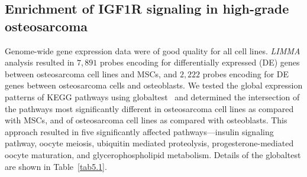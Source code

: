 \subsection{Enrichment of IGF1R signaling in high\hyp{}grade osteosarcoma}
Genome\hyp{}wide gene expression data were of good quality for all cell lines. {\it LIMMA} analysis resulted in $7,891$ probes encoding for differentially expressed (DE) genes between osteosarcoma cell lines and MSCs, and $2,222$ probes encoding for DE genes between osteosarcoma cells and osteoblasts. We tested the global expression patterns of KEGG pathways using globaltest~\cite{goeman2004global} and determined the intersection of the pathways most significantly different in osteosarcoma cell lines as compared with MSCs, and of osteosarcoma cell lines as compared with osteoblasts. This approach resulted in five significantly affected pathways---insulin signaling pathway, oocyte meiosis, ubiquitin mediated proteolysis, progesterone\hyp{}mediated oocyte maturation, and glycerophospholipid metabolism. Details of the globaltest are shown in Table~\ref{tab5.1}.
%
%
